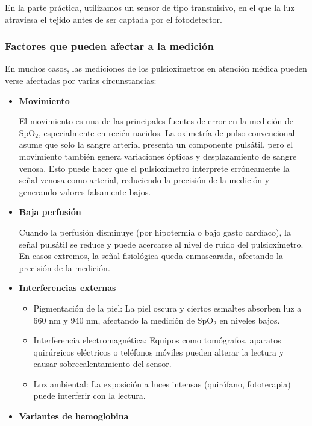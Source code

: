 En la parte práctica, utilizamos un sensor de tipo transmisivo, en el que la luz atraviesa el tejido antes de ser captada por el fotodetector.


\subsubsection{Factores que pueden afectar a la medición }

En muchos casos, las mediciones de los pulsioxímetros en atención médica pueden verse afectadas por varias circunstancias:

\begin{itemize}
\item \textbf{Movimiento}

El movimiento es una de las principales fuentes de error en la medición de SpO$_2$, especialmente en recién nacidos. La oximetría de pulso convencional asume que solo la sangre arterial presenta un componente pulsátil, pero el movimiento también genera variaciones ópticas y desplazamiento de sangre venosa. Esto puede hacer que el pulsioxímetro interprete erróneamente la señal venosa como arterial, reduciendo la precisión de la medición y generando valores falsamente bajos.

\item \textbf{Baja perfusión}

Cuando la perfusión disminuye (por hipotermia o bajo gasto cardíaco), la señal pulsátil se reduce y puede acercarse al nivel de ruido del pulsioxímetro. En casos extremos, la señal fisiológica queda enmascarada, afectando la precisión de la medición. 

\item \textbf{Interferencias externas}

\begin{itemize}
    \item Pigmentación de la piel: La piel oscura y ciertos esmaltes absorben luz a 660 nm y 940 nm, afectando la medición de SpO$_2$ en niveles bajos. 
    \item Interferencia electromagnética: Equipos como tomógrafos, aparatos quirúrgicos eléctricos o teléfonos móviles pueden alterar la lectura y causar sobrecalentamiento del sensor. 
    \item Luz ambiental: La exposición a luces intensas (quirófano, fototerapia) puede interferir con la lectura.
\end{itemize}


\item \textbf{Variantes de hemoglobina}


\end{itemize}
